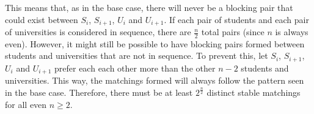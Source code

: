 \documentclass[12pt]{article}%
\begin{document}
This means that, as in the base case, there will never be a blocking pair that could exist between $S_i$, $S_{i + 1}$, $U_i$ and $U_{i + 1}$. If each pair of students and each pair of universities is considered in sequence, there are $\frac{n}{2}$ total pairs (since $n$ is always even). However, it might still be possible to have blocking pairs formed between students and universities that are not in sequence. To prevent this, let $S_i$, $S_{i + 1}$, $U_i$ and $U_{i + 1}$ prefer each each other more than the other $n - 2$ students and universities. This way, the matchings formed will always follow the pattern seen in the base case. Therefore, there must be at least $2^{\frac{n}{2}}$ distinct stable matchings for all even $n \ge 2$.
\end{document}
